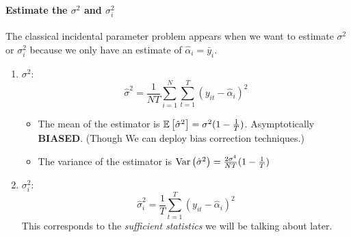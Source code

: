 \paragraph{Estimate the $\sigma^2$ and $\sigma_i^2$}
The classical incidental parameter problem appears when we want to estimate
$\sigma^2$ or $\sigma_i^2$ because we only have an estimate of $\hat{\alpha}_i
    = \bar{y}_i$.
\begin{enumerate}
    \item $\sigma^2$: \begin{equation*}
              \hat{\sigma}^2 = \frac{1}{NT}\sum_{i=1}^N\sum_{t=1}^T (y_{it}-\hat{\alpha}_i)^2
          \end{equation*}
          \begin{itemize}
              \item The mean of the estimator is $\mathbb{E}\left[\hat{\sigma}^2\right] = \sigma^2
                        (1-\frac{1}{T})$. Asymptotically \textbf{BIASED}. (Though We can deploy bias
                    correction techniques.)
              \item The variance of the estimator is $\mathrm{Var}\left(\hat{\sigma}^2\right) =
                        \frac{2\sigma^4}{NT}(1-\frac{1}{T})$
          \end{itemize}
    \item $\sigma_i^2$: \begin{equation*}
              \hat{\sigma}_i^2 = \frac{1}{T}\sum_{t=1}^T (y_{it}-\hat{\alpha}_i)^2
          \end{equation*} This corresponds to the \textit{sufficient statistics} we will be talking about later.
\end{enumerate}
